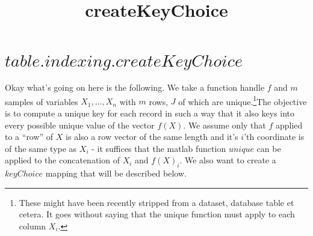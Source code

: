 \documentclass[11pt]{article}
\begin{document}

\title{createKeyChoice}

\section{$table.indexing.createKeyChoice$}

Okay what's going on here is the following. We take a function handle $f$ and $m$ samples of variables $X_1,...,X_n$ with $m$ rows, $J$ of which are unique.\footnote{These might have been recently stripped from a dataset, database table et cetera. It goes without saying that the unique function must apply to each column $X_i$.}The objective is to compute a unique key for each record in such a way that it also keys into every possible unique value of the vector $f(X)$. We assume only that $f$ applied to a ``row'' of $X$ is also a row vector of the same length and it's $i$'th coordinate is of the same type as $X_i$ - it suffices that the matlab function $unique$ can be applied to the concatenation of $X_i$ and $f(X)_i$. We also want to create a $keyChoice$ mapping that will be described below. 
\end{document}
